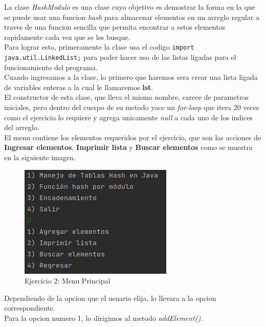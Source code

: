 \documentclass{article}
\begin{document}
			La clase \emph{HashModulo} es una clase cuyo objetivo es demostrar la forma en la que se puede usar una funcion \textit{hash} para almacenar elementos en un arreglo regular a traves de una funcion sencilla que permita encontrar a estos elementos rapidamente cada vez que se les busque.\\
			
			Para lograr esto, primeramente la clase usa el codigo \verb|import java.util.LinkedList;| para poder hacer uso de las listas ligadas para el funcionamiento del programa.\\
			
			Cuando ingresamos a la clase, lo primero que haremos sera crear una lista ligada de variables enteras a la cual le llamaremos \textbf{lst}.\\
			
			El constructor de esta clase, que lleva el mismo nombre, carece de parametros iniciales, pero dentro del cuerpo de su metodo yace un \textit{for-loop} que itera 20 veces como el ejercicio lo requiere y agrega unicamente \textit{null} a cada uno de los indices del arreglo.\\
			
			El menu contiene los elementos requeridos por el ejercicio, que son las acciones de \textbf{Ingresar elementos}, \textbf{Imprimir lista} y \textbf{Buscar elementos} como se muestra en la siguiente imagen.\\
			
			\begin{figure}[H]
				\centering
				\includegraphics[scale=0.9]{images/e21.png}
				\caption*{Ejercicio 2: Menu Principal}
			\end{figure}
		
			Dependiendo de la opcion que el usuario elija, lo llevara a la opcion correspondiente.\\
			
			Para la opcion numero 1, lo dirigimos al metodo \emph{addElement()}.\\
			
\end{document}
